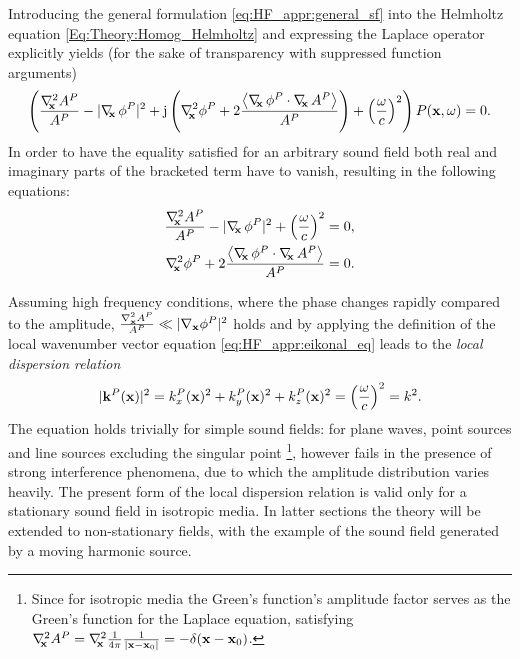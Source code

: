 Introducing the general formulation \eqref{eq:HF_appr:general_sf} into the Helmholtz equation \eqref{Eq:Theory:Homog_Helmholtz} and expressing the Laplace operator explicitly yields (for the sake of transparency with suppressed function arguments)
\begin{equation}
\left( 
\frac{\Lx A^P}{A^P} 
- 
| \Dx \phi^P |^2
+ 
\ti \left(  
\Lx \phi^P
+ 2\frac{ \left< \Dx \phi^P \cdot \Dx A^P \right> }{A^P} 
\right)
+ \left(\frac{\omega}{c}\right)^2 
\right) 
P(\vx,\omega) = 0.
\label{eq:HF_appr:ray_tracing_helmholtz}
\end{equation}
In order to have the equality satisfied for an arbitrary sound field both real and imaginary parts of the bracketed term have to vanish, resulting in the following equations:
\begin{eqnarray} \label{eq:HF_appr:eikonal_eq}
\frac{\Lx A^P}{A^P}  - | \Dx \phi^P |^2 + \left(\frac{\omega}{c}\right)^2 = 0, \\ 
\label{eq:HF_appr:transport_eq}
\Lx \phi^P + 2\frac{ \left< \Dx \phi^P \cdot \Dx A^P \right> }{A^P} = 0.
\end{eqnarray}

Assuming high frequency conditions, where the phase changes rapidly compared to the amplitude, $\frac{\nabla^2_{\mathbf{x}} A^P}{A^P} \ll | \nabla_{\mathbf{x}} \phi^P |^2$ holds
and by applying the definition of the local wavenumber vector equation \eqref{eq:HF_appr:eikonal_eq} leads to the \emph{local dispersion relation}
\begin{equation}
|\mathbf{k}^P(\mathbf{x})|^2 = k^P_x(\mathbf{x})^2 + k^P_y(\mathbf{x})^2 + k^P_z(\mathbf{x})^2 = \left( \frac{\omega}{c} \right)^2 = k^2.
\label{eq:HF_appr:local_dispersion}
\end{equation}
%
The equation holds trivially for simple sound fields: for plane waves, point sources and line sources excluding the singular point \footnote{Since for isotropic media the Green's function's amplitude factor serves as the Green's function for the Laplace equation, satisfying $\nabla^2_{\!\!\mathbf{x}} A^P = \nabla^2_{\!\!\mathbf{x}} \frac{1}{4\pi} \frac{1}{|\mathbf{x}-\mathbf{x}_0|} = -\delta(\mathbf{x}-\mathbf{x}_0)$.}, however fails in the presence of strong interference phenomena, due to which the amplitude distribution varies heavily.
The present form of the local dispersion relation is valid only for a stationary sound field in isotropic media.
In latter sections the theory will be extended to non-stationary fields, with the example of the sound field generated by a moving harmonic source.


